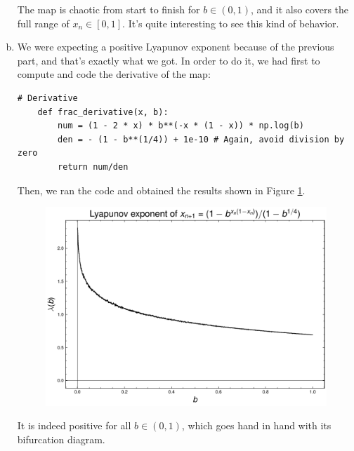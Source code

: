 \begin{enumerate}[(a)]
    The map is chaotic from start to finish for $b \in (0,1)$, and it also covers 
    the full range of $x_n \in [0,1]$. It's quite interesting to see this kind of
    behavior.
    \item We were expecting a positive Lyapunov exponent because of the previous part,
    and that's exactly what we got. In order to do it, we had first to compute and code
    the derivative of the map:
    \begin{lstlisting}[style=pythonstyle]
    # Derivative
    def frac_derivative(x, b):
        num = (1 - 2 * x) * b**(-x * (1 - x)) * np.log(b)
        den = - (1 - b**(1/4)) + 1e-10 # Again, avoid division by zero
        return num/den
    \end{lstlisting}
    Then, we ran the code and obtained the results shown in Figure \ref{fig:3c}.
    \begin{figure}[!ht]
        \centering
        \includegraphics[scale=0.65]{images/frac_lya.pdf}
        \label{fig:3c}
    \end{figure}

    It is indeed positive for all $b \in (0,1)$, which goes hand in hand with its
    bifurcation diagram.
\end{enumerate}



% 
% 

